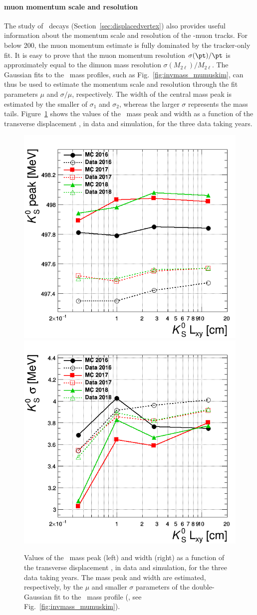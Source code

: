 \paragraph{\Displ muon momentum scale and resolution}
\label{sec:nonpromptleptonscaleresol}
The study of \PKzS\ decays (Section~\ref{sec:displacedvertex}) also
provides useful information about the momentum scale and resolution of
the \displ-muon tracks. For \pt below 200\GeV, the muon momentum 
estimate is fully dominated by the tracker-only fit. It is easy to
prove that the muon momentum resolution $\sigma(\pt)/\pt$ is
approximately equal to the dimuon mass resolution
$\sigma(M_{2\ell})/M_{2\ell}$. The Gaussian fits to the \PKzS\ mass
profiles, such as Fig.~\ref{fig:invmass_mumuskim}, can thus be used to
estimate the momentum scale and resolution through the
fit parameters $\mu$ and $\sigma/\mu$, respectively. The width of the
central mass peak is estimated by the smaller of $\sigma_1$ and
$\sigma_2$, whereas the larger $\sigma$ represents the mass tails.
Figure~\ref{fig:displMuScaleResol} shows the values of the \PKzS\ mass
peak and width as a function of the transverse displacement \Deltwod,
in data and simulation, for the three data taking years.
\begin{figure}[h!]
  \centering
  \includegraphics[width=.4\textwidth]{Figures/c6/systematics/scale_displMu.png}
  \includegraphics[width=.4\textwidth]{Figures/c6/systematics/resolution_displMu.png}
  \caption{Values of the \PKzS\ mass peak (left) and width (right) as
    a function of the transverse displacement \Deltwod, in data and
    simulation, for the three data taking years. The mass peak and
    width are estimated, respectively, by the $\mu$ and smaller
    $\sigma$ parameters of the double-Gaussian fit to the
    \PKzS\ mass profile (\eg, see Fig.~\ref{fig:invmass_mumuskim}).}
  \label{fig:displMuScaleResol}
\end{figure}

